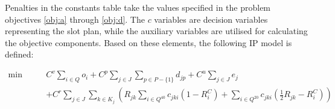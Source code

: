 \documentclass[preprint,12pt,3p]{elsarticle}
\begin{document}
Penalties in the constants table take the values specified in the problem objectives \ref{obj:a} through \ref{obj:d}. The $c$ variables are decision variables representing the slot plan, while the auxiliary variables are utilised for calculating the objective components. Based on these elements, the following IP model is defined:

\small
\begin{equation}
\label{eq:objective}
\begin{aligned}
\min \qquad  & C^v \sum_{i \in Q} o_i + C^p \sum_{j \in J} \sum_{p \in P-\{1\}} d_{jp} + C^u \sum_{j \in J} e_j \\ 
            & + C^r \sum_{j \in J}\sum_{k \in K_j}(R_{jk} \sum_{i \in Q^{40}} c_{jki}(1 - R^{C}_{i}) + \sum_{i \in Q^{20}} c_{jki}(\frac{1}{2}R_{jk} - R^{C}_{i})) 
\end{aligned}
\end{equation}
\end{document}
